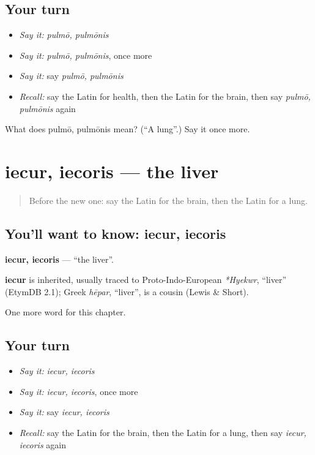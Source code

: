 \subsection*{Your turn}
\begin{itemize}
\raggedright
  \item \emph{Say it:} \emph{pulmō, pulmōnis}
  \item \emph{Say it:} \emph{pulmō, pulmōnis}, once more
  \item \emph{Say it:} say \emph{pulmō, pulmōnis}
  \item \emph{Recall:} say the Latin for health, then the Latin for the brain, then say \emph{pulmō, pulmōnis} again
\end{itemize}

\begin{tcolorbox}[breakable,colback=teal!4,colframe=teal!35!black,title={Before you move on}]
What does pulmō, pulmōnis mean? (\textquotedblleft{}A lung\textquotedblright{}.) Say it once more.
\end{tcolorbox}
\section[iecur, iecoris]{iecur, iecoris — the liver}

\label{lesson:LA-C173-iecur}



\begin{quote}
Before the new one: say the Latin for the brain, then the Latin for a lung.
\end{quote}

\subsection*{You'll want to know: iecur, iecoris}
\textbf{iecur, iecoris} — \textquotedblleft{}the liver\textquotedblright{}.

\begin{cousinweb}
\textbf{iecur} is inherited, usually traced to Proto-Indo-European \emph{*Hyekwr}, \textquotedblleft{}liver\textquotedblright{} (EtymDB 2.1); Greek \emph{hēpar}, \textquotedblleft{}liver\textquotedblright{}, is a cousin (Lewis \& Short).
\end{cousinweb}

\begin{grammarlens}[title={What you've built}]
One more word for this chapter.
\end{grammarlens}

\subsection*{Your turn}
\begin{itemize}
\raggedright
  \item \emph{Say it:} \emph{iecur, iecoris}
  \item \emph{Say it:} \emph{iecur, iecoris}, once more
  \item \emph{Say it:} say \emph{iecur, iecoris}
  \item \emph{Recall:} say the Latin for the brain, then the Latin for a lung, then say \emph{iecur, iecoris} again
\end{itemize}

